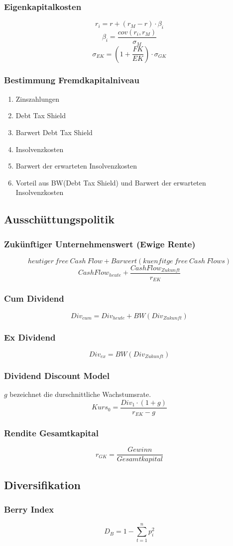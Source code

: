 \subsubsection{Eigenkapitalkosten}
\[r_i = r + (r_M - r) \cdot \beta_i\]
\[\beta_i = \frac{cov(r_i, r_M)}{\sigma_M}\]
\[\sigma_{EK} = (1 + \frac{FK}{EK}) \cdot \sigma_{GK}\]

\subsubsection{Bestimmung Fremdkapitalniveau}
\begin{enumerate}
	\item Zinszahlungen
	\item Debt Tax Shield
	\item Barwert Debt Tax Shield
	\item Insolvenzkosten
	\item Barwert der erwarteten Insolvenzkosten
	\item Vorteil aus BW(Debt Tax Shield) und Barwert der erwarteten Insolvenzkosten
\end{enumerate}


\subsection{Ausschüttungspolitik}

\subsubsection{Zukünftiger Unternehmenswert (Ewige Rente)}
\[heutiger~free~Cash~Flow + Barwert(kuenfitge~free~Cash~Flows)\]
\[CashFlow_{heute} + \frac{CashFlow_{Zukunft}}{r_{EK}}\]

\subsubsection{Cum Dividend}
\[Div_{cum} = Div_{heute} + BW(Div_{Zukunft})\]

\subsubsection{Ex Dividend}
\[Div_{ex} = BW(Div_{Zukunft})\]

\subsubsection{Dividend Discount Model}
\(g\) bezeichnet die durschnittliche Wachstumsrate.
\[Kurs_{0} = \frac{Div_1 \cdot (1+g)}{r_{EK}-g}\]

\subsubsection{Rendite Gesamtkapital}
\[r_{GK} = \frac{Gewinn}{Gesamtkapital}\]


\subsection{Diversifikation}

\subsubsection{Berry Index}
\[D_B = 1 - \sum_{t=1}^{n} p_i^2\]

